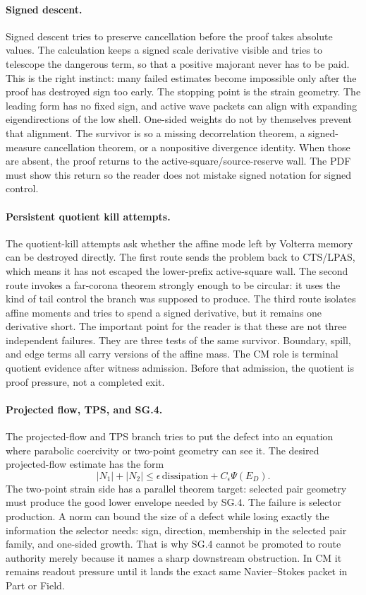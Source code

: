 \paragraph{Signed descent.}
Signed descent tries to preserve cancellation before the proof takes absolute
values.
The calculation keeps a signed scale derivative visible and tries to telescope
the dangerous term, so that a positive majorant never has to be paid.
This is the right instinct: many failed estimates become impossible only after
the proof has destroyed sign too early.
The stopping point is the strain geometry.
The leading form has no fixed sign, and active wave packets can align with
expanding eigendirections of the low shell.
One-sided weights do not by themselves prevent that alignment.
The survivor is so a missing decorrelation theorem, a signed-measure
cancellation theorem, or a nonpositive divergence identity.
When those are absent, the proof returns to the active-square/source-reserve
wall.
The PDF must show this return so the reader does not mistake signed notation
for signed control.

\paragraph{Persistent quotient kill attempts.}
The quotient-kill attempts ask whether the affine mode left by Volterra memory
can be destroyed directly.
The first route sends the problem back to CTS/LPAS, which means it has not
escaped the lower-prefix active-square wall.
The second route invokes a far-corona theorem strongly enough to be circular:
it uses the kind of tail control the branch was supposed to produce.
The third route isolates affine moments and tries to spend a signed derivative,
but it remains one derivative short.
The important point for the reader is that these are not three independent
failures.
They are three tests of the same survivor.
Boundary, spill, and edge terms all carry versions of the affine mass.
The CM role is terminal quotient evidence after witness admission.
Before that admission, the quotient is proof pressure, not a completed exit.

\paragraph{Projected flow, TPS, and SG.4.}
The projected-flow and TPS branch tries to put the defect into an equation
where parabolic coercivity or two-point geometry can see it.
The desired projected-flow estimate has the form
\[
  |N_1|+|N_2|\le \epsilon\,\mathrm{dissipation}+C_\epsilon\Psi(E_D).
\]
The two-point strain side has a parallel theorem target: selected pair geometry
must produce the good lower envelope needed by SG.4.
The failure is selector production.
A norm can bound the size of a defect while losing exactly the information the
selector needs: sign, direction, membership in the selected pair family, and
one-sided growth.
That is why SG.4 cannot be promoted to route authority merely because it names
a sharp downstream obstruction.  In CM it remains readout pressure until it
lands the exact same Navier--Stokes packet in Part or Field.

